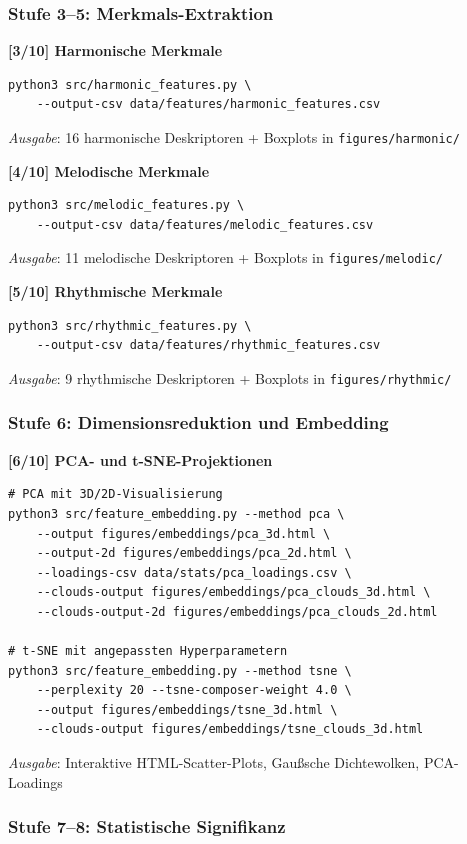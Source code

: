 \documentclass[12pt,a4paper]{article}
\theoremstyle{definition}
\begin{document}
\subsubsection{Stufe 3--5: Merkmals-Extraktion}

\textbf{[3/10] Harmonische Merkmale}
\begin{lstlisting}
python3 src/harmonic_features.py \
    --output-csv data/features/harmonic_features.csv
\end{lstlisting}
\textit{Ausgabe}: 16 harmonische Deskriptoren + Boxplots in \texttt{figures/harmonic/}

\textbf{[4/10] Melodische Merkmale}
\begin{lstlisting}
python3 src/melodic_features.py \
    --output-csv data/features/melodic_features.csv
\end{lstlisting}
\textit{Ausgabe}: 11 melodische Deskriptoren + Boxplots in \texttt{figures/melodic/}

\textbf{[5/10] Rhythmische Merkmale}
\begin{lstlisting}
python3 src/rhythmic_features.py \
    --output-csv data/features/rhythmic_features.csv
\end{lstlisting}
\textit{Ausgabe}: 9 rhythmische Deskriptoren + Boxplots in \texttt{figures/rhythmic/}

\subsubsection{Stufe 6: Dimensionsreduktion und Embedding}

\textbf{[6/10] PCA- und t-SNE-Projektionen}
\begin{lstlisting}
# PCA mit 3D/2D-Visualisierung
python3 src/feature_embedding.py --method pca \
    --output figures/embeddings/pca_3d.html \
    --output-2d figures/embeddings/pca_2d.html \
    --loadings-csv data/stats/pca_loadings.csv \
    --clouds-output figures/embeddings/pca_clouds_3d.html \
    --clouds-output-2d figures/embeddings/pca_clouds_2d.html

# t-SNE mit angepassten Hyperparametern
python3 src/feature_embedding.py --method tsne \
    --perplexity 20 --tsne-composer-weight 4.0 \
    --output figures/embeddings/tsne_3d.html \
    --clouds-output figures/embeddings/tsne_clouds_3d.html
\end{lstlisting}
\textit{Ausgabe}: Interaktive HTML-Scatter-Plots, Gaußsche Dichtewolken, PCA-Loadings

\subsubsection{Stufe 7--8: Statistische Signifikanz}
\end{document}
